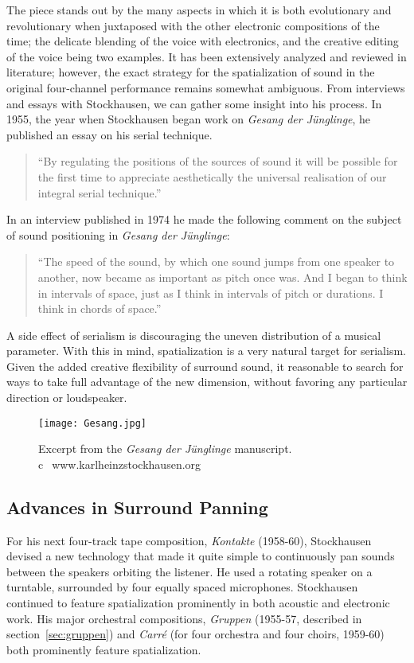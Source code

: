 The piece stands out by the many aspects in which it is both
evolutionary and revolutionary when juxtaposed with the other
electronic compositions of the time; the delicate blending of the
voice with electronics, and the creative editing of the voice being
two examples. It has been extensively analyzed and reviewed in
literature;\cite{Decroupet1998,Metzer2004,Miller2009} however, the
exact strategy for the spatialization of sound in the original
four-channel performance remains somewhat ambiguous. From interviews
and essays with Stockhausen, we can gather some insight into his
process. In 1955, the year when Stockhausen began work on
\textit{Gesang der J\"{u}nglinge}, he published an essay on his serial
technique.
\begin{quotation}
``By regulating the positions of the sources of sound it will be
possible for the first time to appreciate aesthetically the universal
realisation of our integral serial technique.''\cite{Stockhausen1955}
\end{quotation}
In an interview published in 1974 he made the following comment on the
subject of sound positioning in \textit{Gesang der J\"{u}nglinge}:
\begin{quotation}
  ``The speed of the sound, by which one sound jumps from one speaker to
  another, now became as important as pitch once was. And I began to
  think in intervals of space, just as I think in intervals of pitch
  or durations. I think in chords of space.''\cite{Stockhausen1974}
\end{quotation}
A side effect of serialism is discouraging the uneven distribution of
a musical parameter. With this in mind, spatialization is a very
natural target for serialism. Given the added creative flexibility of
surround sound, it reasonable to search for ways to take full
advantage of the new dimension, without favoring any particular
direction or loudspeaker.

\begin{figure}
  \texttt{[image: Gesang.jpg]}
  \caption{Excerpt from the \textit{Gesang der J\"{u}nglinge}
    manuscript. \textcircled{c}~www.karlheinzstockhausen.org}
  \label{fig:schaeffer-score}
\end{figure}

\subsection{Advances in Surround Panning}
\label{sec:advanc-surr-pann}
For his next four-track tape composition, \textit{Kontakte}
(1958-60), Stockhausen devised a new technology that made it quite
simple to continuously pan sounds between the speakers orbiting the
listener. He used a rotating speaker on a turntable, surrounded by
four equally spaced microphones. Stockhausen continued to feature
spatialization prominently in both acoustic and electronic work.  His
major orchestral compositions, \textit{Gruppen} (1955-57, described in
section~\ref{sec:gruppen}) and \textit{Carr\'{e}} (for four orchestra
and four choirs, 1959-60) both prominently feature spatialization.

